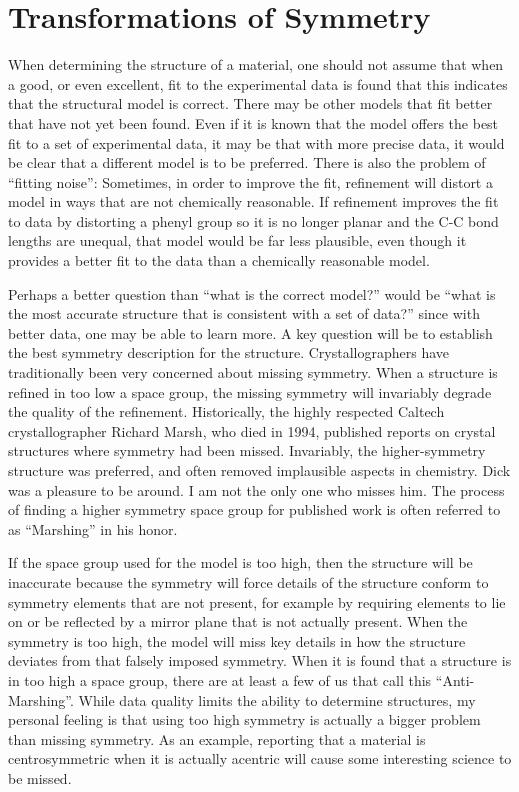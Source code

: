 \chapter{Transformations of Symmetry}\label{Chap:Subgroups}

When determining the structure of a material, one should not assume that when a good, or even excellent, fit to the experimental data is found that this indicates that the structural model is correct. 
There may be other models that fit better that have not yet been found. 
Even if it is known that the model offers the best fit to a set of experimental data, it may be that with more precise data, it would be clear that a different model is to be preferred. There is also the problem of ``fitting noise'': Sometimes, in order to improve the fit, refinement will distort a model in ways that are not chemically reasonable. If refinement improves the fit to data by distorting a phenyl group so it is no longer planar and the C-C bond lengths are unequal, that model would be far less plausible, even though it provides a better fit to the data than a chemically reasonable model. 

Perhaps a better question than ``what is the correct model?'' would be ``what is the most accurate structure that is consistent with a set of data?'' since with better data, one may be able to learn more. A key question will be to establish the best symmetry description for the structure. Crystallographers have traditionally been very concerned about missing symmetry. When a structure is refined in too low a space group, the missing symmetry will invariably degrade the quality of the refinement. Historically, the highly respected Caltech crystallographer Richard Marsh, who died in 1994, published reports on crystal structures where symmetry had been missed. Invariably, the higher-symmetry structure was preferred, and often removed implausible aspects in chemistry. Dick was a pleasure to be around. I am not the only one who misses him. The process of finding a higher symmetry space group for published work is often referred to as ``Marshing'' in his honor. 

If the space group used for the model is too high, then the structure will be inaccurate because the symmetry will force details of the structure conform to symmetry elements that are not present, for example by requiring elements to lie on or be reflected by a mirror plane that is not actually present. When the symmetry is too high, the model will miss key details in how the structure deviates from that falsely imposed symmetry. 
When it is found that a structure is in too high a space group, there are at least a few of us that call this ``Anti-Marshing''. While data quality limits the ability to determine structures, my personal feeling is that using too high symmetry is actually a bigger problem than missing symmetry. As an example, reporting that a material is centrosymmetric when it is actually acentric will cause some interesting science to be missed. 

